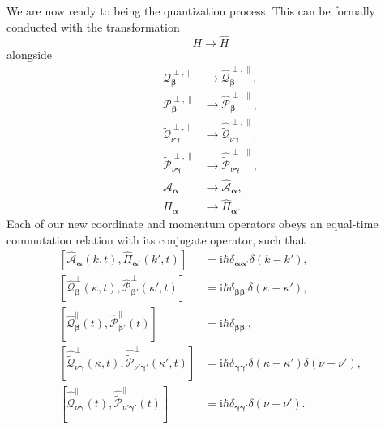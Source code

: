 \documentclass{article}
\begin{document}
We are now ready to being the quantization process. This can be formally conducted with the transformation
\begin{equation}
H\to\hat{H}
\end{equation}
alongside
\begin{equation}
\begin{split}
\mathcal{Q}_{\bm{\beta}}^{\perp,\parallel}&\to\hat{\mathcal{Q}}_{\bm{\beta}}^{\perp,\parallel},\\
\mathcal{P}_{\bm{\beta}}^{\perp,\parallel}&\to\hat{\mathcal{P}}_{\bm{\beta}}^{\perp,\parallel},\\
\tilde{\mathcal{Q}}_{\nu\bm{\gamma}}^{\perp,\parallel}&\to\hat{\tilde{\mathcal{Q}}}_{\nu\bm{\gamma}}^{\perp,\parallel},\\
\tilde{\mathcal{P}}_{\nu\bm{\gamma}}^{\perp,\parallel}&\to\hat{\tilde{\mathcal{P}}}_{\nu\bm{\gamma}}^{\perp,\parallel},\\
\mathcal{A}_{\bm{\alpha}}&\to\hat{\mathcal{A}}_{\bm{\alpha}},\\
\mathit{\Pi}_{\bm{\alpha}}&\to\hat{\mathit{\Pi}}_{\bm{\alpha}}.
\end{split}
\end{equation}
Each of our new coordinate and momentum operators obeys an equal-time commutation relation with its conjugate operator, such that
\begin{equation}
\begin{split}
\left[\hat{\mathcal{A}}_{\bm{\alpha}}(k,t),\hat{\mathit{\Pi}}_{\bm{\alpha}'}(k',t)\right] &= \mathrm{i}\hbar\delta_{\bm{\alpha}\bm{\alpha}'}\delta(k - k'),\\
\left[\hat{\mathcal{Q}}_{\bm{\beta}}^\perp(\kappa,t),\hat{\mathcal{P}}_{\bm{\beta}'}^\perp(\kappa',t)\right] &= \mathrm{i}\hbar\delta_{\bm{\beta}\bm{\beta}'}\delta(\kappa - \kappa'),\\
\left[\hat{\mathcal{Q}}_{\bm{\beta}}^\parallel(t),\hat{\mathcal{P}}_{\bm{\beta}'}^\parallel(t)\right] &= \mathrm{i}\hbar\delta_{\bm{\beta}\bm{\beta}'},\\
\left[\hat{\tilde{\mathcal{Q}}}_{\nu\bm{\gamma}}^\perp(\kappa,t),\hat{\tilde{\mathcal{P}}}_{\nu'\bm{\gamma}'}^\perp(\kappa',t)\right] &= \mathrm{i}\hbar\delta_{\bm{\gamma}\bm{\gamma}'}\delta(\kappa - \kappa')\delta(\nu - \nu'),\\
\left[\hat{\tilde{\mathcal{Q}}}_{\nu\bm{\gamma}}^\parallel(t),\hat{\tilde{\mathcal{P}}}_{\nu'\bm{\gamma}'}^\parallel(t)\right] &= \mathrm{i}\hbar\delta_{\bm{\gamma}\bm{\gamma}'}\delta(\nu - \nu').\\
\end{split}
\end{equation}
\end{document}
